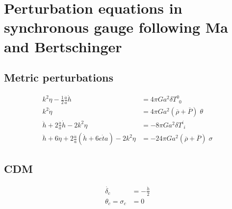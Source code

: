 \documentclass[a4paper]{article}
\begin{document}



\section{Perturbation equations in synchronous gauge following Ma and Bertschinger}
\subsection{Metric perturbations}
\begin{align}
  k^2\eta - \frac{1}{2}\frac{\dot{a}}{a}\dot{h} &= 4\pi G a^2 \delta T^0_{\phantom{0}0}  \\
  k^2\dot{\eta} &= 4\pi G a^2 (\overline{\rho}+\overline{P})\;\theta \\
  \ddot{h} + 2\frac{\dot{a}}{a}\dot{h} - 2k^2\eta &= -8\pi G a^2 \delta T^i_{\phantom{i}i} \\
  \ddot{h} + 6 \ddot{\eta} + 2\frac{\dot{a}}{a}\left(\dot{h}+6\dot{eta}\right) - 2k^2\eta &= -24\pi G a^2 (\overline{\rho}+\overline{P})\;\sigma
\end{align}

\subsection{CDM}
\begin{align}
  \dot{\delta_c} &= - \frac{\dot{h}}{2} \\
  \theta_c = \sigma_c &= 0
\end{align}
\end{document}
